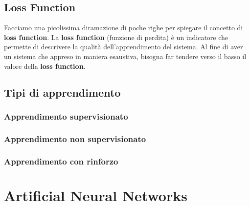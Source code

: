 \subsection{Loss Function}
Facciamo una picolissima diramazione di poche righe per spiegare 
%
il concetto di \textbf{loss function}.
{
    La \textbf{loss function} (funzione di perdita) è un indicatore
%
    che permette di descrivere la  qualità dell'apprendimento del 
%
    sistema.
}
Al fine di aver un sistema che appreso in maniera esaustiva, 
%
bisogna far tendere verso il basso il valore della \textbf{loss 
%
function}.
\subsection{Tipi di apprendimento}
\subsubsection{Apprendimento supervisionato}
\subsubsection{Apprendimento non supervisionato}
\subsubsection{Apprendimento con rinforzo}
\newpage
\section{Artificial Neural Networks}

